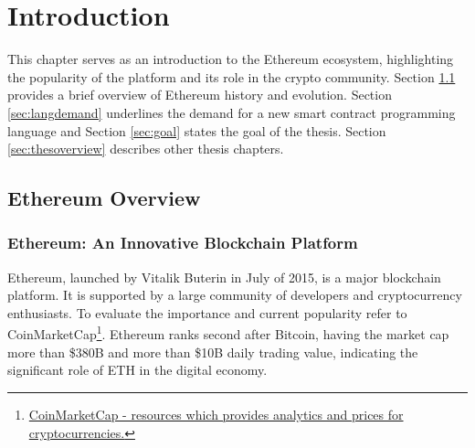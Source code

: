 \chapter{Introduction}
\label{chap:intro}



This chapter serves as an introduction to the Ethereum ecosystem, highlighting the popularity of the platform and its role in the crypto community. 
Section \ref{sec:ethoverview} provides a brief overview of Ethereum history and evolution. Section \ref{sec:langdemand} underlines the demand for a new smart contract programming language and Section \ref{sec:goal} states the goal of the thesis. Section \ref{sec:thesoverview} describes other thesis chapters.


\section{Ethereum Overview}
\label{sec:ethoverview}

\subsection{Ethereum: An Innovative Blockchain Platform}
Ethereum, launched by Vitalik Buterin in July of 2015, is a major blockchain platform. It is supported by a large community of developers and cryptocurrency enthusiasts. To evaluate the importance and current popularity refer to CoinMarketCap\footnote{\href{https://coinmarketcap.com/}{CoinMarketCap - resources which provides analytics and prices for cryptocurrencies.}}. Ethereum ranks second after Bitcoin, having the market cap more than \$380B and more than \$10B daily trading value, indicating the significant role of ETH in the digital economy.

